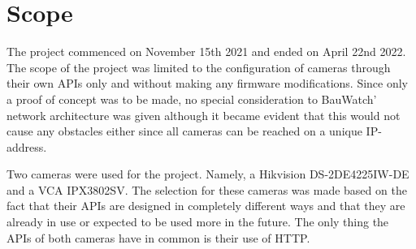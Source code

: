 \section{Scope}


The project commenced on November 15th 2021 and ended on April 22nd 2022. The scope of the project was limited to the configuration of cameras through their own APIs only and
without making any firmware modifications. Since only a proof of concept was to be made, no special consideration to BauWatch' network architecture was given although it became
evident that this would not cause any obstacles either since all cameras can be reached on a unique IP-address.

Two cameras were used for the project. Namely, a Hikvision DS-2DE4225IW-DE and a VCA IPX3802SV.
The selection for these cameras was made based on the fact that their APIs are designed in completely different ways and that they are already in use or expected to be used more in the future.
The only thing the APIs of both cameras have in common is their use of HTTP.
